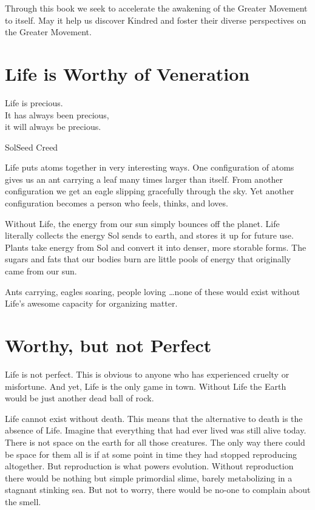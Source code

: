\documentclass[ebook,12pt,openany,twoside]{memoir}
\newcommand{\tab}{\hspace*{2em}}
\newcommand{\imagefacingchapter}[1]{
  \cleartoverso
  \clearpage \null
  \thispagestyle{cleared}
  \AddToShipoutPictureBG*{%
    \AtStockLowerLeft{%
      \texttt{[image: \#1]}
    }
  }
  \clearpage
}
\begin{document}
Through this book we seek to accelerate the awakening of the Greater Movement
to itself. May it help us discover Kindred and foster their diverse
perspectives on the Greater Movement.




\imagefacingchapter{images/LifeIsWorthyOfVeneration}
\chapter{Life is Worthy of Veneration}

\setlength\epigraphwidth{2.25in}
\epigraph{
  Life is precious.\\
  \tab It has always been precious,\\
  \tab it will always be precious.
}{SolSeed Creed}

\noindent Life puts atoms together in very interesting ways. One configuration of atoms
gives us an ant carrying a leaf many times larger than itself. From another
configuration we get an eagle slipping gracefully through the sky. Yet another
configuration becomes a person who feels, thinks, and loves.

Without Life, the energy from our sun simply bounces off the planet. Life
literally collects the energy Sol sends to earth, and stores it up for future
use. Plants take energy from Sol and convert it into denser, more storable
forms. The sugars and fats that our bodies burn are little pools of energy that
originally came from our sun.

Ants carrying, eagles soaring, people loving \ldots none of these would exist
without Life's awesome capacity for organizing matter.


\imagefacingchapter{images/WhatIsWorthy-cropped}
\chapter{Worthy, but not Perfect}

Life is not perfect. This is obvious to anyone who has experienced cruelty or
misfortune. And yet, Life is the only game in town. Without Life the Earth
would be just another dead ball of rock.

Life cannot exist without death. This means that the alternative to death is
the absence of Life. Imagine that everything that had ever lived was still
alive today. There is not space on the earth for all those creatures. The only
way there could be space for them all is if at some point in time they had
stopped reproducing altogether. But reproduction is what powers evolution.
Without reproduction there would be nothing but simple primordial slime, barely
metabolizing in a stagnant stinking sea. But not to worry, there would be
no-one to complain about the smell.
\end{document}
